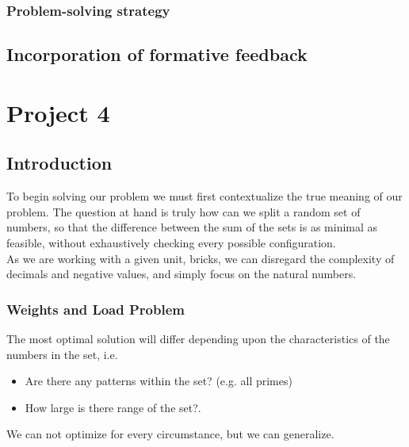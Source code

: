 \documentclass[a4paper]{article}
\begin{document}
\newpage
\subsubsection{Problem-solving strategy}


\subsection{Incorporation of formative feedback}


\newpage



\section{Project 4}
\subsection{Introduction}
To begin solving our problem we must first contextualize the true meaning of our problem.
The question at hand is truly how can we split a random set of numbers,
so that the difference between the sum of the sets is as minimal as feasible, 
without exhaustively checking every possible configuration. \\

As we are working with a given unit, bricks, we can disregard the complexity of decimals and negative values,
and simply focus on the natural numbers.

\subsubsection{Weights and Load Problem}
The most optimal solution will differ depending upon the characteristics of the numbers in the set,
i.e. 

\begin{itemize}
  \item Are there any patterns within the set? (e.g. all primes)
  \item How large is there range of the set?.

\end{itemize}
\vspace{4mm}

We can not optimize for every circumstance, 
but we can generalize. \\
\vspace{4mm}
\end{document}
